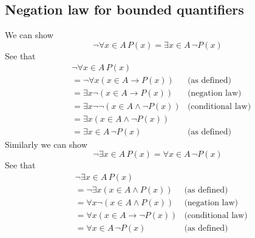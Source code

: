 \documentclass{report}
\begin{document}
\subsection{Negation law for bounded quantifiers}
We can show
\begin{equation*}
\neg\forall x\in A\,P(x)=\exists x\in A\,\neg P(x)
\end{equation*}
See that
\begin{align*}
&\neg\forall x\in A\,P(x)&\\
&=\neg\forall x(x\in A\to P(x))&\text{(as defined)}\\
&=\exists x\neg(x\in A\to P(x))&\text{(negation law)}\\
&=\exists x\neg\neg(x\in A\land\neg P(x))&\text{(conditional law)}\\
&=\exists x(x\in A\land\neg P(x))&\\
&=\exists x\in A\,\neg P(x)&\text{(as defined)}
\end{align*}
Similarly we can show
\begin{equation*}
\neg\exists x\in A\,P(x)=\forall x\in A\,\neg P(x)
\end{equation*}
See that
\begin{align*}
&\neg\exists x\in A\,P(x)&\\
&=\neg\exists x(x\in A\land P(x))&\text{(as defined)}\\
&=\forall x\neg(x\in A\land P(x))&\text{(negation law)}\\
&=\forall x(x\in A\to\neg P(x))&\text{(conditional law)}\\
&=\forall x\in A\,\neg P(x)&\text{(as defined)}
\end{align*}
\newpage
\end{document}
